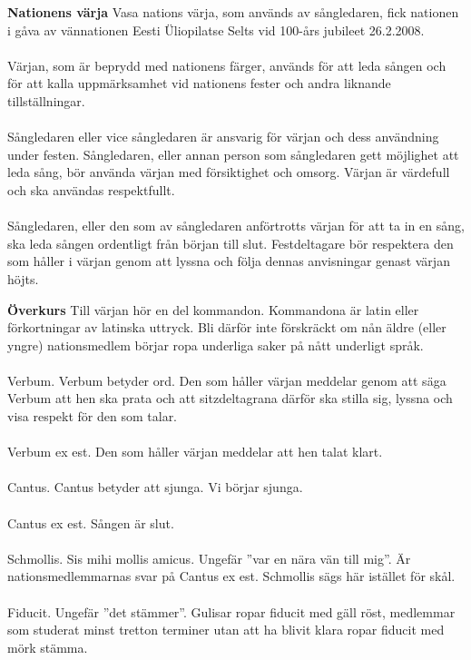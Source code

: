\flushleft\textbf{Nationens värja}
Vasa nations värja, som används av sångledaren, fick nationen i gåva av vännationen Eesti Üliopilatse Selts vid 100-års jubileet 26.2.2008. 
\\
~\\
Värjan, som är beprydd med nationens färger, används för att leda sången och för att kalla uppmärksamhet vid nationens fester och andra liknande tillställningar.
\\
~\\
Sångledaren eller vice sångledaren är ansvarig för värjan och dess användning under festen. Sångledaren, eller annan person som sångledaren gett möjlighet att leda sång, bör använda värjan med försiktighet och omsorg. Värjan är värdefull och ska användas respektfullt. 
\\
~\\
Sångledaren, eller den som av sångledaren anförtrotts värjan för att ta in en sång, ska leda sången ordentligt från början till slut. Festdeltagare bör respektera den som håller i värjan genom att lyssna och följa dennas anvisningar genast värjan höjts.

\flushleft\textbf{Överkurs}
Till värjan hör en del kommandon. Kommandona är latin eller förkortningar av latinska uttryck. Bli därför inte förskräckt om nån äldre (eller yngre) nationsmedlem börjar ropa underliga saker på nått underligt språk. 
\\
~\\
Verbum. Verbum betyder ord. Den som håller värjan meddelar genom att säga Verbum att hen ska prata och att sitzdeltagrana därför ska stilla sig, lyssna och visa respekt för den som talar.
\\
~\\
Verbum ex est. Den som håller värjan meddelar att hen talat klart.
\\
~\\
Cantus.  Cantus betyder att sjunga. Vi börjar sjunga.
\\
~\\
Cantus ex est. Sången är slut.
\\
~\\
Schmollis. Sis mihi mollis amicus. Ungefär ”var en nära vän till mig”. Är nationsmedlemmarnas svar på Cantus ex est. Schmollis sägs här istället för skål.  
\\
~\\
Fiducit. Ungefär ”det stämmer”. Gulisar ropar fiducit med gäll röst, medlemmar som studerat minst tretton terminer utan att ha blivit klara ropar fiducit med mörk stämma.
 









